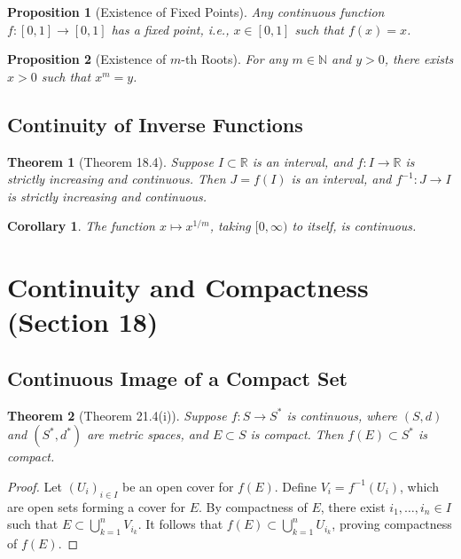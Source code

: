 \documentclass[9pt]{article}
\theoremstyle{definition}
\theoremstyle{plain}
\newtheorem{theorem}{Theorem}
\newtheorem{proposition}{Proposition}
\newtheorem{corollary}{Corollary}
\begin{document}
\begin{proposition}[Existence of Fixed Points]
Any continuous function $ f : [0, 1] \to [0, 1] $ has a fixed point, i.e., $ x \in [0, 1] $ such that $ f(x) = x $.
\end{proposition}

\begin{proposition}[Existence of $ m $-th Roots]
For any $ m \in \mathbb{N} $ and $ y > 0 $, there exists $ x > 0 $ such that $ x^m = y $.
\end{proposition}

\subsection*{Continuity of Inverse Functions}
\begin{theorem}[Theorem 18.4]
Suppose $ I \subset \mathbb{R} $ is an interval, and $ f : I \to \mathbb{R} $ is strictly increasing and continuous. Then $ J = f(I) $ is an interval, and $ f^{-1} : J \to I $ is strictly increasing and continuous.
\end{theorem}

\begin{corollary}
The function $ x \mapsto x^{1/m} $, taking $ [0, \infty) $ to itself, is continuous.
\end{corollary}
\section*{Continuity and Compactness (Section 18)}

\subsection*{Continuous Image of a Compact Set}
\begin{theorem}[Theorem 21.4(i)]
Suppose $ f : S \to S^* $ is continuous, where $ (S, d) $ and $ (S^*, d^*) $ are metric spaces, and $ E \subset S $ is compact. Then $ f(E) \subset S^* $ is compact.
\end{theorem}

\begin{proof}
Let $ (U_i)_{i \in I} $ be an open cover for $ f(E) $. Define $ V_i = f^{-1}(U_i) $, which are open sets forming a cover for $ E $. By compactness of $ E $, there exist $ i_1, \ldots, i_n \in I $ such that $ E \subset \bigcup_{k=1}^n V_{i_k} $. It follows that $ f(E) \subset \bigcup_{k=1}^n U_{i_k} $, proving compactness of $ f(E) $.
\end{proof}
\end{document}
